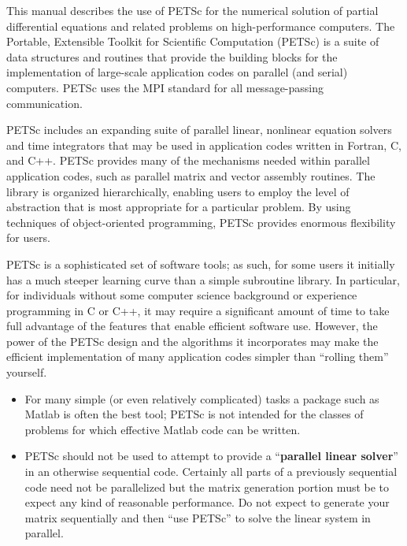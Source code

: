
%
%

\medskip \medskip
This manual describes the use of PETSc for the numerical solution
of partial differential equations and related problems 
on high-performance computers.  The
Portable, Extensible Toolkit for Scientific Computation (PETSc) is a
suite of data structures and routines that provide the building
blocks for the implementation of large-scale application codes on parallel
(and serial) computers.  PETSc uses the MPI standard for all
message-passing communication.

PETSc includes an expanding suite of parallel linear, nonlinear
equation solvers and time integrators that may be
used in application codes written in Fortran, C, and C++.  PETSc
provides many of the mechanisms needed within parallel application
codes, such as parallel matrix and vector assembly routines. The library is
organized hierarchically, enabling users to employ the level of
abstraction that is most appropriate for a particular problem. By
using techniques of object-oriented programming, PETSc provides
enormous flexibility for users.

PETSc is a sophisticated set of software tools; as such, for some
users it initially has a much steeper learning curve than a simple
subroutine library. In particular, for individuals without some
computer science background or experience programming in C or C++, it
may require a significant amount of time to take full advantage of the
features that enable efficient software use.  However, the power of
the PETSc design and the algorithms it incorporates may make the efficient
implementation of many application codes simpler than ``rolling
them'' yourself.
\begin{itemize}
\item  For many simple (or even relatively complicated)
tasks a package such as Matlab is often the best tool; PETSc is not
intended for the classes of problems for which effective Matlab code
can be written.
\item PETSc should not be used to attempt to provide
a ``{\bf parallel linear solver}'' in an otherwise sequential code.
Certainly all parts of a previously sequential code need not be parallelized but the 
matrix generation portion must be to expect any kind of reasonable performance.
Do not expect to generate your matrix sequentially and then ``use PETSc'' to solve
the linear system in parallel.
\end{itemize}

